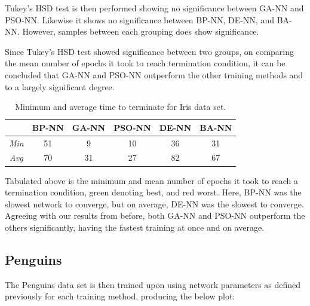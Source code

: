 \documentclass[a4paper,12pt]{article}
\begin{document}
Tukey's HSD test is then performed showing no significance between GA-NN and PSO-NN. Likewise it shows no significance between BP-NN, DE-NN, and BA-NN. However, samples between each grouping does show significance.

Since Tukey's HSD test showed significance between two groups, on comparing the mean number of epochs it took to reach termination condition, it can be concluded that GA-NN and PSO-NN outperform the other training methods and to a largely significant degree.

\begin{table}[h!]
\centering
\begin{tabular}{c|c|c|c|c|c|}
\cline{2-6}
 & \textbf{BP-NN} & \textbf{GA-NN} & \textbf{PSO-NN} & \textbf{DE-NN} & \textbf{BA-NN} \\ \hline
\multicolumn{1}{|c|}{\textit{Min}} & \cellcolor[HTML]{FFCCC9}51 & \cellcolor[HTML]{C5F1BF}9 & 10 & 36 & 31 \\ \hline
\multicolumn{1}{|c|}{\textit{Avg}} & 70 & 31 & \cellcolor[HTML]{C5F1BF}27 & \cellcolor[HTML]{FFCCC9}82 & 67 \\ \hline
\end{tabular}
\caption{Minimum and average time to terminate for Iris data set.}
\label{Tab:iris-min}
\end{table}

Tabulated above is the minimum and mean number of epochs it took to reach a termination condition, green denoting best, and red worst. Here, BP-NN was the slowest network to converge, but on average, DE-NN was the slowest to converge. Agreeing with our results from before, both GA-NN and PSO-NN outperform the others significantly, having the fastest training at once and on average.

\pagebreak

\subsection{Penguins}

The Penguins data set is then trained upon using network parameters as defined previously for each training method, producing the below plot:
\end{document}
